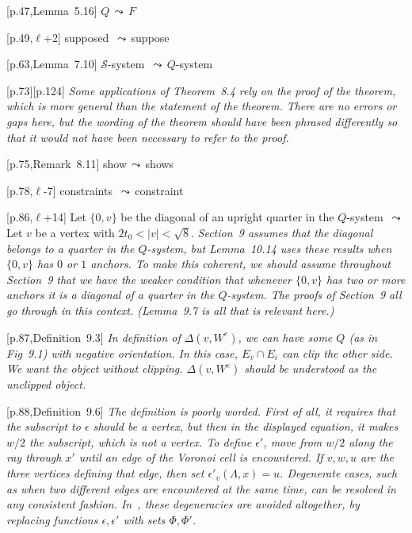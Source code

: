 \documentclass[11pt]{amsart}
\def\lto{\ensuremath{\,\leadsto\,}}
\def\line{$\ell$}
\def\sz{small} %
\begin{document}
\begin{\sz}
\baselineskip

[p.47,Lemma~5.16] $Q\lto F$

[p.49,\line+2] supposed \lto suppose
	
[p.63,Lemma~7.10]
	${\mathcal S}$-system \lto $Q$-system
	
[p.73][p.124] {\it Some applications of Theorem~8.4 rely on
the proof of the theorem, which is more general than
the statement of the theorem.  There are no errors or gaps here,
but the wording of the theorem should have been phrased differently
so that it would not have been necessary to refer to the proof.}

[p.75,Remark~8.11]
	show\lto shows

[p.78,\line-7] constraints \lto constraint

[p.86,\line+14] Let $\{0,v\}$ be 
          the diagonal of an upright quarter in the $Q$-system
        \lto
       Let $v$ be a vertex with $2t_0<|v|<\sqrt8$.
           {\it Section~9 assumes that the diagonal belongs to
          a quarter in the $Q$-system, but Lemma~10.14 uses these
          results when $\{0,v\}$ has $0$ or $1$ anchors.  To make
          this coherent, we should assume throughout Section~9 that
          we have the weaker condition that whenever $\{0,v\}$ has
          two or more anchors it is a diagonal of a quarter in the $Q$-system.
          The proofs of Section~9 all go through in this context.
          (Lemma~9.7 is all that is relevant here.)}

[p.87,Definition~9.3]
	{\it In definition of $\Delta(v,W^e)$, we
	can have some $Q$ (as in Fig~9.1)
	with negative orientation.
	In this case, $E_v\cap E_i$ can clip
	the other side.  We want the object
	without clipping.   $\Delta(v,W^e)$ should be understood as the
        unclipped object.}
	
[p.88,Definition~9.6]
	{\it The definition is poorly worded.  First of
	all, it requires that the subscript to
	$\epsilon$ should be a vertex, but then in
	the displayed equation, it makes $w/2$ the
	subscript, which is not a vertex.   To
	define $\epsilon'$, move from $w/2$ along
	the ray through $x'$ until an edge of the
	Voronoi cell is encountered.  If $v,w,u$
	are the three vertices defining that edge,
	then set $\epsilon'_v(\Lambda,x)=u$.
	Degenerate cases, such as when two different
	edges are encountered at the same time,
	can be resolved in any consistent fashion.  In~\cite{hales:2008:collection},
      these degeneracies are avoided altogether, by replacing functions 
      $\epsilon,\epsilon'$ with sets $\Phi,\Phi'$.
     }
	

\end{\sz}
\end{document}

